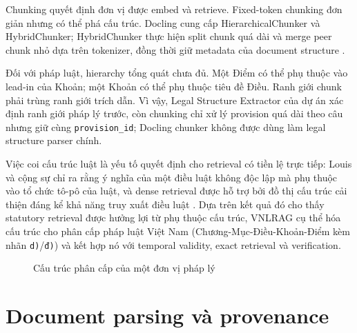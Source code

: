 \documentclass[a4paper,12pt]{extreport}
\newcommand{\code}[1]{\texttt{#1}}
\begin{document}
Chunking quyết định đơn vị được embed và retrieve. Fixed-token chunking đơn giản nhưng có thể phá cấu trúc. Docling cung cấp HierarchicalChunker và HybridChunker; HybridChunker thực hiện split chunk quá dài và merge peer chunk nhỏ dựa trên tokenizer, đồng thời giữ metadata của document structure \cite{docling2026chunking}.

Đối với pháp luật, hierarchy tổng quát chưa đủ. Một Điểm có thể phụ thuộc vào lead-in của Khoản; một Khoản có thể phụ thuộc tiêu đề Điều. Ranh giới chunk phải trùng ranh giới trích dẫn. Vì vậy, Legal Structure Extractor của dự án xác định ranh giới pháp lý trước, còn chunking chỉ xử lý provision quá dài theo câu nhưng giữ cùng \code{provision\_id}; Docling chunker không được dùng làm legal structure parser chính.

Việc coi cấu trúc luật là yếu tố quyết định cho retrieval có tiền lệ trực tiếp: Louis và cộng sự chỉ ra rằng ý nghĩa của một điều luật không độc lập mà phụ thuộc vào tổ chức tô-pô của luật, và dense retrieval được hỗ trợ bởi đồ thị cấu trúc cải thiện đáng kể khả năng truy xuất điều luật \cite{louis2023findinglaw}. Dựa trên kết quả đó cho thấy statutory retrieval được hưởng lợi từ phụ thuộc cấu trúc, VNLRAG cụ thể hóa cấu trúc cho phân cấp pháp luật Việt Nam (Chương-Mục-Điều-Khoản-Điểm kèm nhãn \code{d)}/\code{đ)}) và kết hợp nó với temporal validity, exact retrieval và verification.

\begin{figure}[H]
\centering
{}
\caption{Cấu trúc phân cấp của một đơn vị pháp lý}
\label{fig:legal-hierarchy}
\end{figure}

\section{Document parsing và provenance}
\end{document}
